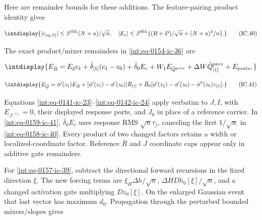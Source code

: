 
Here are remainder bounds for these additions. The feature-pairing product identity gives


\begingroup\renewcommand{\theHequation}{intdisplay.340}
\begin{equation}
\intdisplay{
|c_{aq,[1]}|\le\beta^{10L}(N+u)/\sqrt n,\quad
 |E_c|\le\beta^{40L}\{(R+P)/\sqrt n+(N+u)^2/n\}.
}
\tag{IC.40}
\label{int:eq-0158-ic-40}
\end{equation}
\endgroup


The exact product/mixer remainders in \eqref{int:eq-0154-ic-36} are


\begingroup\renewcommand{\theHequation}{intdisplay.341}
\begin{equation*}
\intdisplay{
E_{\bar R}=E_{\bar\delta}c_1+
       \bar\delta_{[1]}(c_1-c_0)+\bar\delta_0E_c
       +W_1E_{\bar Q^{\rm prev}}
       +\Delta W\bar Q_{[1]}^{\rm prev}+E_{\rm ports},
}
\end{equation*}
\endgroup

\begingroup\renewcommand{\theHequation}{intdisplay.342}
\begin{equation}
\intdisplay{
E_{\bar Q}=\phi'(z_1)E_{\bar R}
       +[\phi'(z_1)-\phi'(z_0)]\bar R_{[1]}
       +\bar R_0[\phi'(z_1)-\phi'(z_0)-\phi''(z_0)z_{[1]}].
}
\tag{IC.41}
\label{int:eq-0159-ic-41}
\end{equation}
\endgroup


Equations \eqref{int:eq-0141-ic-23}--\allowbreak \eqref{int:eq-0142-ic-24} apply verbatim to \(J,\allowbreak I\), with \(E_{J^{(1)}}=0\), their displayed response ports, and \(J_0\) in place of a reference carrier. In \eqref{int:eq-0159-ic-41}, \(\bar\delta_0E_c\) uses response RMS \(\sqrt n\tau_j\), canceling the first \(1/\sqrt n\) in \eqref{int:eq-0158-ic-40}. Every product of two changed factors retains a width or localized-coordinate factor. Reference \(\bar R\) and \(J\) coordinate caps appear only in additive gate remainders.



For \eqref{int:eq-0157-ic-39}, subtract the directional forward recursions in the fixed direction \(\xi\). The new forcing terms are \(\xi_H\Delta h/\sqrt n\), \(\Delta H Dh_0[\xi]/\sqrt n\), and a changed activation gate multiplying \(Dz_0[\xi]\). On the enlarged Gaussian event that last vector has maximum \(d_0\). Propagation through the perturbed bounded mixers/slopes gives


